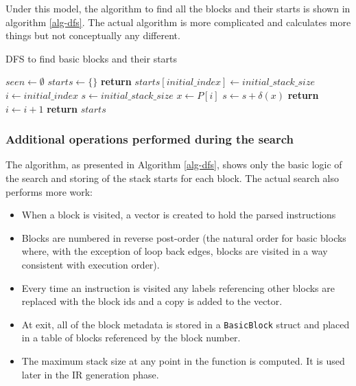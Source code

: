 Under this model, the algorithm to find all the blocks and their starts is shown in algorithm
\ref{alg-dfs}. The actual algorithm is more complicated and calculates more things but not
conceptually any different.

\begin{algorithm}
      \caption{DFS to find basic blocks and their starts}\label{alg-dfs}
      \begin{algorithmic}[1]
            \State $seen \gets \emptyset$
            \State $starts \gets \{\}$
            \State \textbf{return}
            \EndIf
            \State $starts[initial\_index] \gets initial\_stack\_size$
            \State $i \gets initial\_index$
            \State $s \gets initial\_stack\_size$
            \Repeat
            \State $x \gets P[i]$
            \State $s \gets s + \delta(x)$
            \State {}
            \EndFor
            \State {}
            \EndIf
            \State \textbf{return}
            \EndIf
            \State $i \gets i + 1$
            \EndFunction
            \State {}
            \State \textbf{return} $starts$
            \EndFunction
      \end{algorithmic}
\end{algorithm}

\subsubsection{Additional operations performed during the search} \label{addop}

The algorithm, as presented in Algorithm \ref{alg-dfs}, shows only the basic logic of the search
and
storing of the stack starts for each block. The actual search also performs more work:

\begin{itemize}
      \item When a block is visited, a vector is created to hold the parsed instructions
      \item Blocks are numbered in reverse post-order (the natural order for basic blocks where,
            with the exception of loop back edges, blocks are visited in a way consistent with
            execution order).
      \item Every time an instruction is visited any labels referencing other blocks are replaced
            with the block ids and a copy is added to the vector.
      \item At exit, all of the block metadata is stored in a \texttt{BasicBlock} struct and placed
            in a table of blocks referenced by the block number.
      \item The maximum stack size at any point in the function is computed. It is used later in
            the IR generation phase.
\end{itemize}

